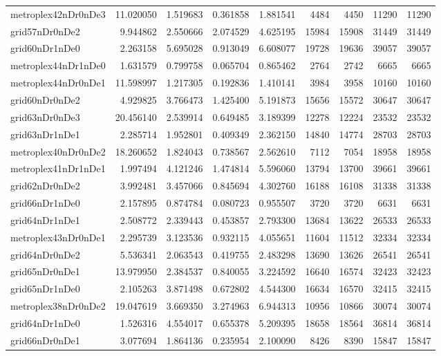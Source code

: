\begin{longtable}{|l|r|r|r|r|r|r|r|r|}
metroplex42nDr0nDe3 & 11.020050 & 1.519683 & 0.361858 & 1.881541 & 4484 & 4450 & 11290 & 11290 \\
grid57nDr0nDe2 & 9.944862 & 2.550666 & 2.074529 & 4.625195 & 15984 & 15908 & 31449 & 31449 \\
grid60nDr1nDe0 & 2.263158 & 5.695028 & 0.913049 & 6.608077 & 19728 & 19636 & 39057 & 39057 \\
metroplex44nDr1nDe0 & 1.631579 & 0.799758 & 0.065704 & 0.865462 & 2764 & 2742 & 6665 & 6665 \\
metroplex44nDr0nDe1 & 11.598997 & 1.217305 & 0.192836 & 1.410141 & 3984 & 3958 & 10160 & 10160 \\
grid60nDr0nDe2 & 4.929825 & 3.766473 & 1.425400 & 5.191873 & 15656 & 15572 & 30647 & 30647 \\
grid63nDr0nDe3 & 20.456140 & 2.539914 & 0.649485 & 3.189399 & 12278 & 12224 & 23532 & 23532 \\
grid63nDr1nDe1 & 2.285714 & 1.952801 & 0.409349 & 2.362150 & 14840 & 14774 & 28703 & 28703 \\
metroplex40nDr0nDe2 & 18.260652 & 1.824043 & 0.738567 & 2.562610 & 7112 & 7054 & 18958 & 18958 \\
metroplex41nDr1nDe1 & 1.997494 & 4.121246 & 1.474814 & 5.596060 & 13794 & 13700 & 39661 & 39661 \\
grid62nDr0nDe2 & 3.992481 & 3.457066 & 0.845694 & 4.302760 & 16188 & 16108 & 31338 & 31338 \\
grid66nDr1nDe0 & 2.157895 & 0.874784 & 0.080723 & 0.955507 & 3720 & 3720 & 6631 & 6631 \\
grid64nDr1nDe1 & 2.508772 & 2.339443 & 0.453857 & 2.793300 & 13684 & 13622 & 26533 & 26533 \\
metroplex43nDr0nDe1 & 2.295739 & 3.123536 & 0.932115 & 4.055651 & 11604 & 11512 & 32334 & 32334 \\
grid64nDr0nDe2 & 5.536341 & 2.063543 & 0.419755 & 2.483298 & 13690 & 13626 & 26541 & 26541 \\
grid65nDr0nDe1 & 13.979950 & 2.384537 & 0.840055 & 3.224592 & 16640 & 16574 & 32423 & 32423 \\
grid65nDr1nDe0 & 2.105263 & 3.871498 & 0.672802 & 4.544300 & 16634 & 16570 & 32415 & 32415 \\
metroplex38nDr0nDe2 & 19.047619 & 3.669350 & 3.274963 & 6.944313 & 10956 & 10866 & 30074 & 30074 \\
grid64nDr1nDe0 & 1.526316 & 4.554017 & 0.655378 & 5.209395 & 18658 & 18564 & 36814 & 36814 \\
grid66nDr0nDe1 & 3.077694 & 1.864136 & 0.235954 & 2.100090 & 8426 & 8390 & 15847 & 15847 \\

\end{longtable}
